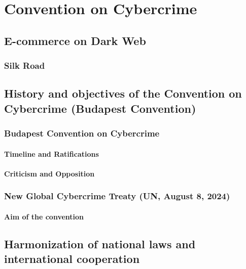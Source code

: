 \chapter{Convention on Cybercrime}

\section{E-commerce on Dark Web}

\subsection{Silk Road}

\section{History and objectives of the Convention on Cybercrime (Budapest Convention)}

\subsection{Budapest Convention on Cybercrime }

\subsubsection{Timeline and Ratifications}

\subsubsection{Criticism and Opposition}


\subsection{New Global Cybercrime Treaty (UN, August 8, 2024)}

\subsubsection{Aim of the convention}

\section{Harmonization of national laws and international cooperation}

